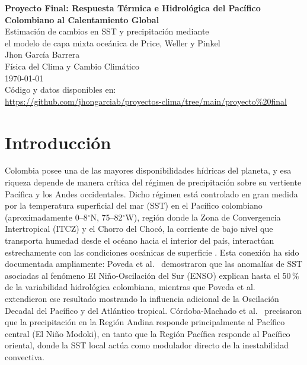 \documentclass[12pt, a4paper]{article}
\begin{document}
	
	\begin{titlepage}
		\centering
		\vspace*{2cm}
		{\LARGE \textbf{Proyecto Final: Respuesta T\'ermica e Hidrol\'ogica
				del Pac\'ifico Colombiano al Calentamiento Global}\\[0.5em]
			\large Estimaci\'on de cambios en SST y precipitaci\'on mediante\\
			el modelo de capa mixta oce\'anica de Price, Weller y Pinkel}\\[2cm]
		{\large Jhon Garc\'ia Barrera}\\[0.5em]
		{\normalsize F\'isica del Clima y Cambio Clim\'atico}\\[0.5em]
		{\normalsize \today}\\[3cm]
		\vfill
		{\small C\'odigo y datos disponibles en:\\
			\url{https://github.com/jhongarciab/proyectos-clima/tree/main/proyecto%20final}}
	\end{titlepage}
	
	\tableofcontents
	\newpage

\section{Introducci\'on}

Colombia posee una de las mayores disponibilidades h\'idricas del planeta, y esa riqueza 
depende de manera cr\'itica del r\'egimen de precipitaci\'on sobre su vertiente Pac\'ifica 
y los Andes occidentales. Dicho r\'egimen est\'a controlado en gran medida por la 
temperatura superficial del mar (SST) en el Pac\'ifico colombiano (aproximadamente 
0--8$^{\circ}$N, 75--82$^{\circ}$W), regi\'on donde la Zona de Convergencia Intertropical 
(ITCZ) y el Chorro del Choc\'o, la corriente de bajo nivel que transporta humedad desde 
el oc\'eano hacia el interior del pa\'is, interact\'uan estrechamente con las condiciones 
oce\'anicas de superficie \cite{Poveda2004}. Esta conexi\'on ha sido documentada 
ampliamente: Poveda et al.\ \cite{Poveda2001} demostraron que las anomal\'ias de SST 
asociadas al fen\'omeno El Ni\~no-Oscilaci\'on del Sur (ENSO) explican hasta el 50\,\% de 
la variabilidad hidrol\'ogica colombiana, mientras que Poveda et al.\ \cite{Poveda2011} 
extendieron ese resultado mostrando la influencia adicional de la Oscilaci\'on Decadal del 
Pac\'ifico y del Atl\'antico tropical. C\'ordoba-Machado et al.\ \cite{CordobaMachado2015} 
precisaron que la precipitaci\'on en la Regi\'on Andina responde principalmente al 
Pac\'ifico central (El Ni\~no Modoki), en tanto que la Regi\'on Pac\'ifica responde al 
Pac\'ifico oriental, donde la SST local act\'ua como modulador directo de la inestabilidad 
convectiva.
\end{document}
